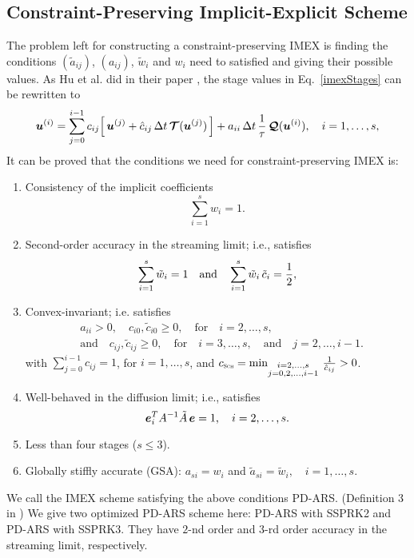 \subsection{Constraint-Preserving Implicit-Explicit Scheme}
The problem left for constructing a constraint-preserving IMEX is finding the conditions $(\tilde{a}_{ij})$, $(a_{ij})$, $\tilde{w}_{i}$ and $w_{i}$ need to satisfied and giving their possible values.
As Hu et al. did in their paper \cite{hu_etal_2018}, the stage values in Eq.~\eqref{imexStages} can be rewritten to
\begin{equation}
  \boldsymbol{u}^{(i)}
  =\sum_{j=0}^{i-1}c_{ij}\Big[\,\boldsymbol{u}^{(j)}+\hat{c}_{ij}\,\Delta t\,\boldsymbol{\mathcal{T}}(\boldsymbol{u}^{(j)})\,\Big]
  +a_{ii}\,\Delta t\,\frac{1}{\tau}\,\boldsymbol{\mathcal{Q}}(\boldsymbol{u}^{(i)}),\quad i=1,\ldots,s,
  \label{eq:imexStagesRewrite}
\end{equation}
It can be proved \cite{chu_2018} that the conditions we need for constraint-preserving IMEX is:
\begin{enumerate}
    \item Consistency of the implicit coefficients
    \begin{equation}
      \sum_{i=1}^{s}w_{i}=1.
    \end{equation}
    \item Second-order accuracy in the streaming limit; i.e., satisfies \begin{equation}
      \sum_{i=1}^{s}\tilde{w}_{i}=1
      \quad\text{and}\quad
      \sum_{i=1}^{s}\tilde{w}_{i}\,\tilde{c}_{i}=\frac{1}{2},
      \label{eq:orderConditionsEx}
    \end{equation}
    \item Convex-invariant; i.e. satisfies 
    \begin{align}
      &a_{ii}>0, \quad c_{i0},\tilde{c}_{i0}\ge0, \quad \text{for} \quad i=2,\ldots,s, \nonumber \\
      &\text{and} \quad c_{ij},\tilde{c}_{ij}\ge0, \quad \text{for} \quad i=3,\ldots,s, \quad\text{and}\quad j=2,\ldots,i-1.  
    \end{align}
    with $\sum_{j=0}^{i-1}c_{ij}=1$, for $i=1,\ldots,s$, and $c_{\textnormal{\tiny\textsc{Sch}}}=\min_{\substack{i = 2,\ldots,s \\ 
                  j = 0,2,\ldots,i-1}}\,\frac{1}{\hat{c}_{ij}}>0$.
    \item Well-behaved in the diffusion limit; i.e., satisfies \begin{equation}
      \boldsymbol{e}_{i}^{T}A^{-1}\tilde{A}\,\boldsymbol{e} = 1, \quad i=2,\ldots,s.
      \label{eq:diffusionCondition}
    \end{equation}
    \item Less than four stages ($s\le3$).
    \item Globally stiffly accurate (GSA): $a_{si}=w_{i}$ and $\tilde{a}_{si}=\tilde{w}_{i},\quad i=1,\ldots,s$.
\end{enumerate}  
We call the IMEX scheme satisfying the above conditions {PD-ARS}. (Definition 3 in \cite{Chu_2018})
We give two optimized PD-ARS scheme here: PD-ARS with SSPRK2 and  PD-ARS with SSPRK3. They have $2$-nd order and $3$-rd order accuracy in the streaming limit, respectively.
